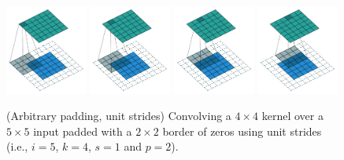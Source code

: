 \documentclass[notitlepage]{report}
\begin{document}
\begin{figure}[p]
    \centering
    \includegraphics[width=0.24\textwidth]{pdf/arbitrary_padding_no_strides_00.pdf}
    \includegraphics[width=0.24\textwidth]{pdf/arbitrary_padding_no_strides_01.pdf}
    \includegraphics[width=0.24\textwidth]{pdf/arbitrary_padding_no_strides_02.pdf}
    \includegraphics[width=0.24\textwidth]{pdf/arbitrary_padding_no_strides_03.pdf}
    \caption{\label{fig:arbitrary_padding_no_strides} (Arbitrary padding, unit
        strides) Convolving a $4 \times 4$ kernel over a $5 \times 5$ input
        padded with a $2 \times 2$ border of zeros using unit strides (i.e.,
        $i = 5$, $k = 4$, $s = 1$ and $p = 2$).}
\end{figure}
\end{document}
